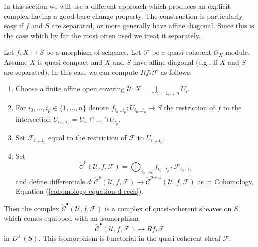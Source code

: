 \medskip\noindent
In this section we will use a different approach which produces an
explicit complex having a good base change property. The construction
is particularly easy if $f$ and $S$ are separated, or more generally
have affine diagonal. Since this is the case which
by far the most often used we treat it separately.

\begin{lemma}
\label{lemma-separated-case-relative-cech}
Let $f : X \to S$ be a morphism of schemes.
Let $\mathcal{F}$ be a quasi-coherent $\mathcal{O}_X$-module.
Assume $X$ is quasi-compact and $X$ and $S$ have affine diagonal
(e.g., if $X$ and $S$ are separated).
In this case we can compute $Rf_*\mathcal{F}$ as follows:
\begin{enumerate}
\item Choose a finite affine open covering
$\mathcal{U} : X = \bigcup_{i = 1, \ldots, n} U_i$.
\item For $i_0, \ldots, i_p \in \{1, \ldots, n\}$ denote
$f_{i_0 \ldots i_p} : U_{i_0 \ldots i_p} \to S$ the restriction of $f$
to the intersection $U_{i_0 \ldots i_p} = U_{i_0} \cap \ldots \cap U_{i_p}$.
\item Set $\mathcal{F}_{i_0 \ldots i_p}$ equal to the restriction
of $\mathcal{F}$ to $U_{i_0 \ldots i_p}$.
\item Set
$$
\check{\mathcal{C}}^p(\mathcal{U}, f, \mathcal{F}) =
\bigoplus\nolimits_{i_0 \ldots i_p}
f_{i_0 \ldots i_p *} \mathcal{F}_{i_0 \ldots i_p}
$$
and define differentials
$d : \check{\mathcal{C}}^p(\mathcal{U}, f, \mathcal{F})
\to \check{\mathcal{C}}^{p + 1}(\mathcal{U}, f, \mathcal{F})$
as in Cohomology, Equation (\ref{cohomology-equation-d-cech}).
\end{enumerate}
Then the complex $\check{\mathcal{C}}^\bullet(\mathcal{U}, f, \mathcal{F})$
is a complex of quasi-coherent sheaves on $S$ which comes equipped with an
isomorphism
$$
\check{\mathcal{C}}^\bullet(\mathcal{U}, f, \mathcal{F})
\longrightarrow
Rf_*\mathcal{F}
$$
in $D^{+}(S)$. This isomorphism is functorial in the quasi-coherent
sheaf $\mathcal{F}$.
\end{lemma}


